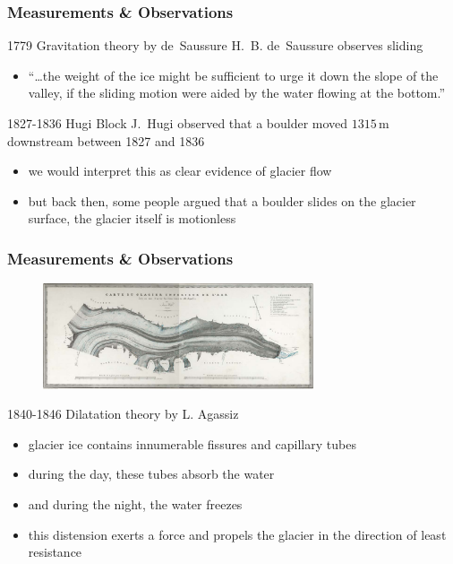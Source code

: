 \documentclass[hide notes,intlimits,unknownkeysallowed]{beamer}
\begin{document}
\begin{frame}
  \frametitle{Measurements \& Observations}
    \begin{block}{1779 Gravitation theory by de~Saussure}
      H.~B. de~Saussure observes sliding
      \begin{itemize}
        \item ``\ldots the weight of the ice might be sufficient to urge it down the slope of the valley, if the sliding motion were aided by the water flowing at the bottom.''
      \end{itemize}
    \end{block}
    \begin{block}{1827-1836 Hugi Block}
      J.~Hugi observed that a boulder moved $1315\,\text{m}$ downstream between 1827 and 1836
      \begin{itemize}
        \item we would interpret this as clear evidence of glacier flow
        \item but back then, some people argued that a boulder slides on the glacier surface, the glacier itself is motionless
      \end{itemize}
    \end{block}
\end{frame}

\begin{frame}
  \frametitle{Measurements \& Observations}
  \begin{figure}
    \includegraphics[width=8cm]{agassi}%
  \end{figure}
    \begin{block}{1840-1846 Dilatation theory by L. Agassiz}
      \begin{itemize}
        \item glacier ice contains innumerable fissures and capillary tubes
        \item during the day, these tubes absorb the water
        \item and during the night, the water freezes
        \item this distension exerts a force and propels the glacier in the direction of least resistance
      \end{itemize}
    \end{block}
\end{frame}
\end{document}
